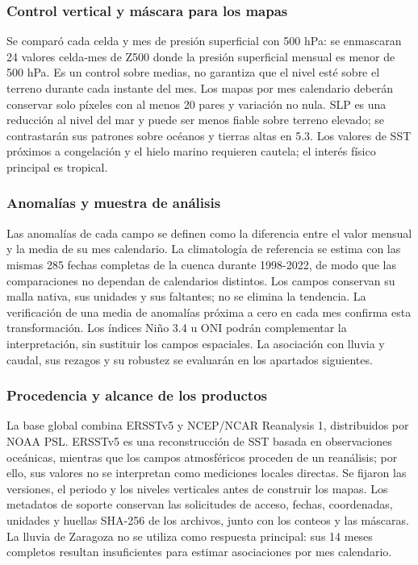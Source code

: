\documentclass[10pt,a4paper]{article}
\begin{document}
\subsubsection*{Control vertical y máscara para los mapas}
Se comparó cada celda y mes de presión superficial con 500 hPa: se enmascaran 24 valores celda-mes de Z500 donde la presión superficial mensual es menor de 500 hPa. Es un control sobre medias, no garantiza que el nivel esté sobre el terreno durante cada instante del mes. Los mapas por mes calendario deberán conservar solo píxeles con al menos 20 pares y variación no nula. SLP es una reducción al nivel del mar y puede ser menos fiable sobre terreno elevado; se contrastarán sus patrones sobre océanos y tierras altas en 5.3. Los valores de SST próximos a congelación y el hielo marino requieren cautela; el interés físico principal es tropical.

\subsubsection*{Anomalías y muestra de análisis}
Las anomalías de cada campo se definen como la diferencia entre el valor mensual y la media de su mes calendario. La climatología de referencia se estima con las mismas 285 fechas completas de la cuenca durante 1998-2022, de modo que las comparaciones no dependan de calendarios distintos. Los campos conservan su malla nativa, sus unidades y sus faltantes; no se elimina la tendencia. La verificación de una media de anomalías próxima a cero en cada mes confirma esta transformación. Los índices Niño 3.4 u ONI podrán complementar la interpretación, sin sustituir los campos espaciales. La asociación con lluvia y caudal, sus rezagos y su robustez se evaluarán en los apartados siguientes.

\subsubsection*{Procedencia y alcance de los productos}
La base global combina ERSSTv5 y NCEP/NCAR Reanalysis 1, distribuidos por NOAA PSL. ERSSTv5 es una reconstrucción de SST basada en observaciones oceánicas, mientras que los campos atmosféricos proceden de un reanálisis; por ello, sus valores no se interpretan como mediciones locales directas. Se fijaron las versiones, el periodo y los niveles verticales antes de construir los mapas. Los metadatos de soporte conservan las solicitudes de acceso, fechas, coordenadas, unidades y huellas SHA-256 de los archivos, junto con los conteos y las máscaras. La lluvia de Zaragoza no se utiliza como respuesta principal: sus 14 meses completos resultan insuficientes para estimar asociaciones por mes calendario.
\end{document}
